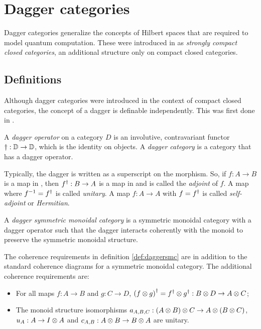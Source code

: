 \section{Dagger categories}\label{sec:daggercategories}
Dagger categories generalize the concepts of Hilbert spaces that are required to model quantum
computation. These were introduced in \cite{abramsky04:catsemquantprot} as \emph{strongly compact
closed categories}, an additional structure only on compact closed categories.


\subsection{Definitions}\label{sec:daggerdefinitions}

Although dagger categories were introduced in the context of compact closed categories, the concept
of a dagger is definable independently. This was first done in \cite{selinger05:dagger}.

\begin{definition}\label{def:daggercat}
  A \emph{dagger operator} on a category $D$ is an involutive, contravariant functor $\dagger:\mathbb{D}\to
  \mathbb{D}$, which is the identity on objects. A \emph{dagger category} is a category that has a dagger
  operator.
\end{definition}

Typically, the dagger is written as a superscript on the morphism. So, if $f:A\to B$ is a map in
\cD, then ${f}^{\dagger}:B\to A$ is a map in \cD{} and is called the \emph{adjoint} of $f$. A map where
$f^{-1} = {f}^{\dagger}$ is called \emph{unitary}. A map $f:A\to A$ with $f={f}^{\dagger}$ is called
\emph{self-adjoint} or \emph{Hermitian}.

\begin{definition}\label{def:daggersmc}
  A \emph{dagger symmetric monoidal category} is a symmetric monoidal category \cD{} with a dagger
  operator such that the dagger interacts coherently with the monoid to preserve the symmetric
  monoidal structure.
\end{definition}

The coherence requirements in definition \ref{def:daggersmc} are in addition to the standard
coherence diagrams for a symmetric monoidal category. The additional coherence requirements are:
\begin{itemize}
  \item For all maps $f:A\to B$ and $g:C\to D$, ${(f\otimes g)}^{\dagger} = {f}^{\dagger}\otimes{g}^{\dagger}:B\otimes D \to A\otimes C$;
  \item The monoid structure isomorphisms $a_{A,B,C}:(A\otimes B)\otimes C\to A\otimes(B\otimes C)$, $u_{A}:A\to I\otimes A$ and
    $c_{A,B}:A\otimes B \to B\otimes A$ are unitary.
\end{itemize}

